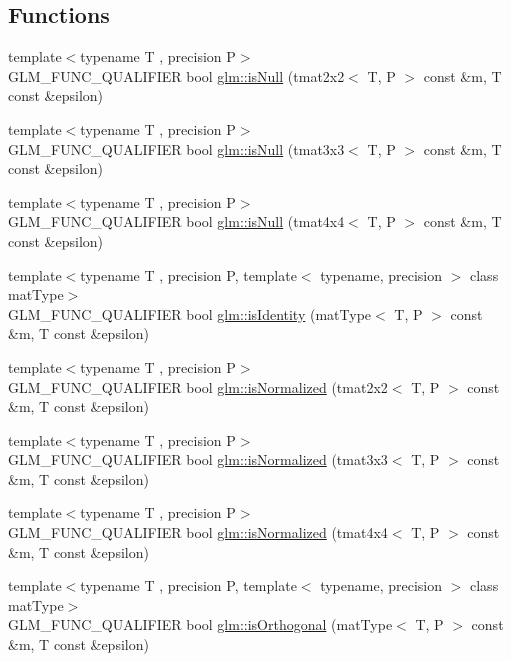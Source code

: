 \subsection*{Functions}
\begin{DoxyCompactItemize}
\item 
{\footnotesize template$<$typename T , precision P$>$ }\\G\+L\+M\+\_\+\+F\+U\+N\+C\+\_\+\+Q\+U\+A\+L\+I\+F\+I\+E\+R bool \hyperlink{group__gtx__matrix__query_ga37e535cbeaea383b8c1247b98875cd4b}{glm\+::is\+Null} (tmat2x2$<$ T, P $>$ const \&m, T const \&epsilon)
\item 
{\footnotesize template$<$typename T , precision P$>$ }\\G\+L\+M\+\_\+\+F\+U\+N\+C\+\_\+\+Q\+U\+A\+L\+I\+F\+I\+E\+R bool \hyperlink{group__gtx__matrix__query_gac67a5c7e029a84b74b02ac9599b8972d}{glm\+::is\+Null} (tmat3x3$<$ T, P $>$ const \&m, T const \&epsilon)
\item 
{\footnotesize template$<$typename T , precision P$>$ }\\G\+L\+M\+\_\+\+F\+U\+N\+C\+\_\+\+Q\+U\+A\+L\+I\+F\+I\+E\+R bool \hyperlink{group__gtx__matrix__query_ga326de496972051413c7b44b85fc9cb6e}{glm\+::is\+Null} (tmat4x4$<$ T, P $>$ const \&m, T const \&epsilon)
\item 
{\footnotesize template$<$typename T , precision P, template$<$ typename, precision $>$ class mat\+Type$>$ }\\G\+L\+M\+\_\+\+F\+U\+N\+C\+\_\+\+Q\+U\+A\+L\+I\+F\+I\+E\+R bool \hyperlink{group__gtx__matrix__query_gafc1ce12c738b8c5d007179e615609330}{glm\+::is\+Identity} (mat\+Type$<$ T, P $>$ const \&m, T const \&epsilon)
\item 
{\footnotesize template$<$typename T , precision P$>$ }\\G\+L\+M\+\_\+\+F\+U\+N\+C\+\_\+\+Q\+U\+A\+L\+I\+F\+I\+E\+R bool \hyperlink{group__gtx__matrix__query_ga11a8d5cdb36496b85f61e4f5f7f2602c}{glm\+::is\+Normalized} (tmat2x2$<$ T, P $>$ const \&m, T const \&epsilon)
\item 
{\footnotesize template$<$typename T , precision P$>$ }\\G\+L\+M\+\_\+\+F\+U\+N\+C\+\_\+\+Q\+U\+A\+L\+I\+F\+I\+E\+R bool \hyperlink{group__gtx__matrix__query_ga351bcc8d485d329b78cfa875e084964d}{glm\+::is\+Normalized} (tmat3x3$<$ T, P $>$ const \&m, T const \&epsilon)
\item 
{\footnotesize template$<$typename T , precision P$>$ }\\G\+L\+M\+\_\+\+F\+U\+N\+C\+\_\+\+Q\+U\+A\+L\+I\+F\+I\+E\+R bool \hyperlink{group__gtx__matrix__query_ga934b673ec0e16d79eca0ca9dbb5d6d8b}{glm\+::is\+Normalized} (tmat4x4$<$ T, P $>$ const \&m, T const \&epsilon)
\item 
{\footnotesize template$<$typename T , precision P, template$<$ typename, precision $>$ class mat\+Type$>$ }\\G\+L\+M\+\_\+\+F\+U\+N\+C\+\_\+\+Q\+U\+A\+L\+I\+F\+I\+E\+R bool \hyperlink{group__gtx__matrix__query_gab2cb5d23df77b4e4e63ad2965acd31b3}{glm\+::is\+Orthogonal} (mat\+Type$<$ T, P $>$ const \&m, T const \&epsilon)
\end{DoxyCompactItemize}


